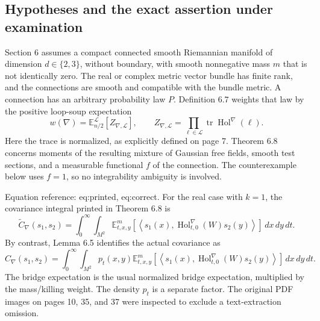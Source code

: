 \documentclass[10pt]{article}
\begin{document}
\subsection*{Hypotheses and the exact assertion under examination}
Section 6 assumes a compact connected smooth Riemannian manifold of dimension \(d\in\{2,3\}\), without boundary, with smooth nonnegative mass \(m\) that is not identically zero. The real or complex metric vector bundle has finite rank, and the connections are smooth and compatible with the bundle metric. A connection has an arbitrary probability law \(P\). Definition 6.7 weights that law by the positive loop-soup expectation \[w(\nabla)=\mathbb E^{\mathcal L}_{n/2}[Z_{\nabla,\mathcal L}],
 \qquad
 Z_{\nabla,\mathcal L}=\prod_{\ell\in\mathcal L}\operatorname{tr}\operatorname{Hol}^\nabla(\ell).\] Here the trace is normalized, as explicitly defined on page 7. Theorem 6.8 concerns moments of the resulting mixture of Gaussian free fields, smooth test sections, and a measurable functional \(f\) of the connection. The counterexample below uses \(f=1\), so no integrability ambiguity is involved.\par
Equation reference: eq:printed, eq:correct. For the real case with \(k=1\), the covariance integral printed in Theorem 6.8 is \[
 \widetilde C_\nabla(s_1,s_2)
 =\int_0^\infty\!\int_{M^2}
 \mathbb E^m_{t,x,y}\!
 \left[\left\langle s_1(x),\operatorname{Hol}^\nabla_{t,0}(W)s_2(y)\right\rangle\right]
 \,dx\,dy\,dt .\] By contrast, Lemma 6.5 identifies the actual covariance as \[
 C_\nabla(s_1,s_2)
 =\int_0^\infty\!\int_{M^2}p_t(x,y)
 \mathbb E^m_{t,x,y}\!
 \left[\left\langle s_1(x),\operatorname{Hol}^\nabla_{t,0}(W)s_2(y)\right\rangle\right]
 \,dx\,dy\,dt .\] The bridge expectation is the usual normalized bridge expectation, multiplied by the mass/killing weight. The density \(p_t\) is a separate factor. The original PDF images on pages 10, 35, and 37 were inspected to exclude a text-extraction omission.\par
\end{document}

